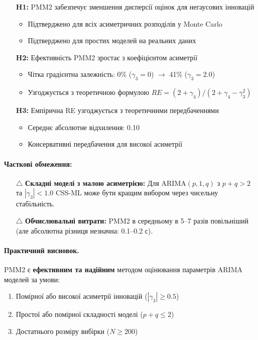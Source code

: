 \documentclass[12pt,a4paper]{article}
\begin{document}
\begin{itemize}
    \item[\checkmark] \textbf{H1:} PMM2 забезпечує зменшення дисперсії оцінок для негаусових інновацій
    \begin{itemize}
        \item Підтверджено для всіх асиметричних розподілів у Monte Carlo
        \item Підтверджено для простих моделей на реальних даних
    \end{itemize}

    \item[\checkmark] \textbf{H2:} Ефективність PMM2 зростає з коефіцієнтом асиметрії
    \begin{itemize}
        \item Чітка градієнтна залежність: 0\% ($\gamma_3=0$) $\rightarrow$ 41\% ($\gamma_3=2.0$)
        \item Узгоджується з теоретичною формулою $RE = (2+\gamma_4)/(2+\gamma_4-\gamma_3^2)$
    \end{itemize}

    \item[\checkmark] \textbf{H3:} Емпірична RE узгоджується з теоретичними передбаченнями
    \begin{itemize}
        \item Середнє абсолютне відхилення: 0.10
        \item Консервативні передбачення для високої асиметрії
    \end{itemize}
\end{itemize}

\paragraph{Часткові обмеження:}

\begin{itemize}
    \item[$\triangle$] \textbf{Складні моделі з малою асиметрією:} Для ARIMA$(p,1,q)$ з $p+q > 2$ та $|\gamma_3| < 1.0$ CSS-ML може бути кращим вибором через чисельну стабільність.

    \item[$\triangle$] \textbf{Обчислювальні витрати:} PMM2 в середньому в 5--7 разів повільніший (але абсолютна різниця незначна: 0.1--0.2 с).
\end{itemize}

\paragraph{Практичний висновок.}
PMM2 є \textbf{ефективним та надійним} методом оцінювання параметрів ARIMA моделей за умови:
\begin{enumerate}
    \item Помірної або високої асиметрії інновацій ($|\gamma_3| \geq 0.5$)
    \item Простої або помірної складності моделі ($p+q \leq 2$)
    \item Достатнього розміру вибірки ($N \geq 200$)
\end{enumerate}
\end{document}
